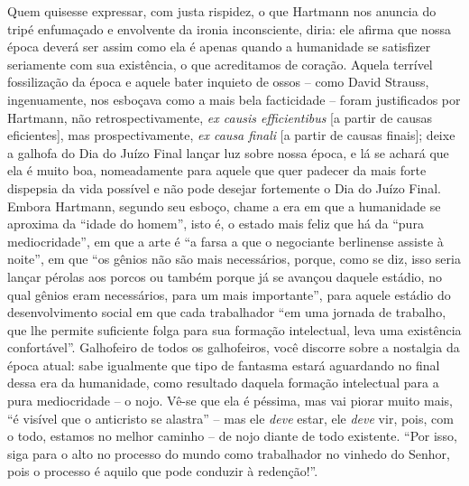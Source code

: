     Quem quisesse expressar, com justa rispidez, o que Hartmann nos
    anuncia do tripé enfumaçado e envolvente da ironia inconsciente,
    diria: ele afirma que nossa época deverá ser assim como ela é apenas
    quando a humanidade se satisfizer seriamente com sua existência, o
    que acreditamos de coração. Aquela terrível fossilização da época e
    aquele bater inquieto de ossos -- como David Strauss, ingenuamente,
    nos esboçava como a mais bela facticidade -- foram justificados por
    Hartmann, não retrospectivamente, \emph{ex causis efficientibus}
    {[}a partir de causas eficientes{]}, mas prospectivamente, \emph{ex
    causa finali} {[}a partir de causas finais{]}; deixe a galhofa do
    Dia do Juízo Final lançar luz sobre nossa época, e lá se achará que
    ela é muito boa, nomeadamente para aquele que quer padecer da mais
    forte dispepsia da vida possível e não pode desejar fortemente o Dia
    do Juízo Final. Embora Hartmann, segundo seu esboço, chame a era em
    que a humanidade se aproxima da ``idade do homem'', isto é, o estado
    mais feliz que há da ``pura mediocridade'', em que a arte é ``a
    farsa a que o negociante berlinense assiste à noite'', em que ``os
    gênios não são mais necessários, porque, como se diz, isso seria
    lançar pérolas aos porcos ou também porque já se avançou daquele
    estádio, no qual gênios eram necessários, para um mais importante'',
    para aquele estádio do desenvolvimento social em que cada
    trabalhador ``em uma jornada de trabalho, que lhe permite suficiente
    folga para sua formação intelectual, leva uma existência
    confortável''. Galhofeiro de todos os galhofeiros, você discorre
    sobre a nostalgia da época atual: sabe igualmente que tipo de
    fantasma estará aguardando no final dessa era da humanidade, como
    resultado daquela formação intelectual para a pura mediocridade -- o
    nojo. Vê-se que ela é péssima, mas vai piorar muito mais, ``é
    visível que o anticristo se alastra'' -- mas ele \emph{deve} estar,
    ele \emph{deve} vir, pois, com o todo, estamos no melhor caminho --
    de nojo diante de todo existente. ``Por isso, siga para o alto no
    processo do mundo como trabalhador no vinhedo do Senhor, pois o
    processo é aquilo que pode conduzir à redenção!''.

